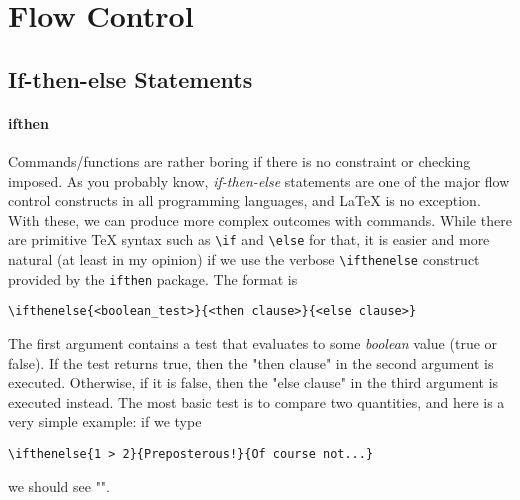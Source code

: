 \section{Flow Control}

\subsection{If-then-else Statements}

\paragraph{ifthen}
Commands/functions are rather boring if there is no constraint or checking imposed. As you probably know, \textit{if-then-else} statements are one of the major flow control constructs in all programming languages, and \LaTeX{} is no exception. With these, we can produce more complex outcomes with commands. While there are primitive \TeX{} syntax such as \texttt{\textbackslash if} and \texttt{\textbackslash else} for that, it is easier and more natural (at least in my opinion) if we use the verbose \texttt{\textbackslash ifthenelse} construct provided by the \texttt{ifthen} package. The format is
\begin{lstlisting}
\ifthenelse{<boolean_test>}{<then clause>}{<else clause>}
\end{lstlisting}
The first argument contains a test that evaluates to some \textit{boolean} value (true or false). If the test returns true, then the "then clause" in the second argument is executed. Otherwise, if it is false, then the "else clause" in the third argument is executed instead. The most basic test is to compare two quantities, and here is a very simple example: if we type
\begin{lstlisting}
\ifthenelse{1 > 2}{Preposterous!}{Of course not...}    
\end{lstlisting}
we should see "".

